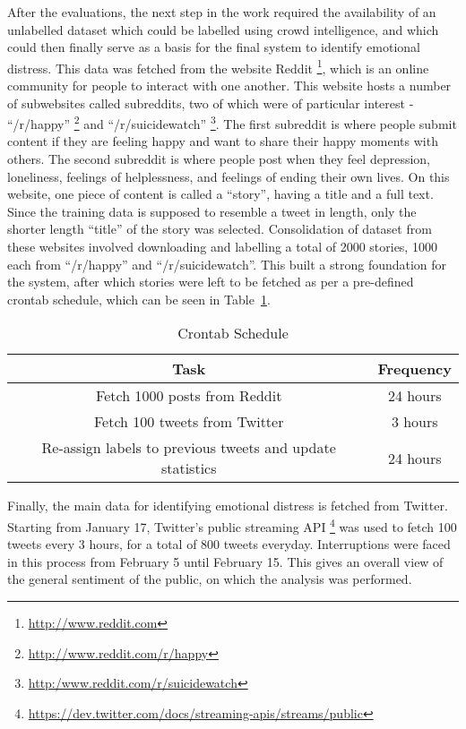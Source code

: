 After the evaluations, the next step in the work required the availability of an unlabelled dataset which could be labelled using crowd intelligence, and which could then finally serve as a basis for the final system to identify emotional distress. This data was fetched from the website Reddit \footnote{\url{http://www.reddit.com}}, which is an online community for people to interact with one another. This website hosts a number of subwebsites called subreddits, two of which were of particular interest - ``/r/happy'' \footnote{\url{http://www.reddit.com/r/happy}} and ``/r/suicidewatch'' \footnote{\url{http:/www.reddit.com/r/suicidewatch}}. The first subreddit is where people submit content if they are feeling happy and want to share their happy moments with others. The second subreddit is where people post when they feel depression, loneliness, feelings of helplessness, and feelings of ending their own lives. On this website, one piece of content is called a ``story'', having a title and a full text. Since the training data is supposed to resemble a tweet in length, only the shorter length ``title'' of the story was selected. Consolidation of dataset from these websites involved downloading and labelling a total of 2000 stories, 1000 each from ``/r/happy'' and ``/r/suicidewatch''. This built a strong foundation for the system, after which stories were left to be fetched as per a pre-defined crontab schedule, which can be seen in Table~\ref{tab:cron_schedule}.\\

\begin{table}
    \begin{center}
        \begin{tabular}{ | c | c | }
            \hline
            \textbf{Task} & \textbf{Frequency} \\
            \hline
            Fetch 1000 posts from Reddit & 24 hours \\
            \hline
            Fetch 100 tweets from Twitter & 3 hours \\
            \hline
            Re-assign labels to previous tweets and update statistics & 24 hours \\
            \hline
        \end{tabular}
    \end{center}
    \caption{Crontab Schedule}
    \label{tab:cron_schedule}
\end{table}

Finally, the main data for identifying emotional distress is fetched from Twitter. Starting from January 17, Twitter's public streaming API \footnote{\url{https://dev.twitter.com/docs/streaming-apis/streams/public}} was used to fetch 100 tweets every 3 hours, for a total of 800 tweets everyday. Interruptions were faced in this process from February 5 until February 15. This gives an overall view of the general sentiment of the public, on which the analysis was performed.

